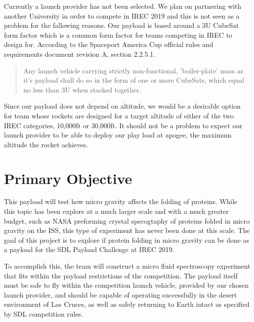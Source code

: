 \documentclass[conference]{IEEEtran} %
\begin{document}
Currently a launch provider has not been selected. We plan on partnering with another University in order to compete in IREC 2019 and this is not seen as a problem for the fallowing reasons. Our payload is based around a 3U CubeSat form factor which is a common form factor for teams competing in IREC to design for. According to the Spaceport America Cup official rules and requirements document revision A, section 2.2.5.1.\begin{quote} Any launch vehicle carrying strictly non-functional, 'boiler-plate' mass as it's payload shall do so in the form of one or more CubeSats, which equal no less than 3U when stacked together.\cite{sdl}\end{quote} Since our payload does not depend on altitude, we would be a desirable option for team whose rockets are designed for a target altitude of either of the two IREC categories, 10,000ft or 30,000ft.\cite{sdl} It should not be a problem to expect our launch provider to be able to deploy our play load at apogee, the maximum altitude the rocket achieves.

%

\section{Primary Objective}
\label{sec:primary-obj}

This payload will test how micro gravity affects the folding of proteins. While this topic has been explore at a much larger scale and with a much greater budget, such as NASA preforming crystal specogtaphy of proteins folded in micro gravity on the ISS, this type of experiment has never been done at this scale. The goal of this project is to explore if protein folding in micro gravity can be done as a payload for the SDL Payload Challenge at IREC 2019. 

To accomplish this, the team will construct a micro fluid spectroscopy experiment that fits within the payload restrictions of the competition. The payload itself must be safe to fly within the competition launch vehicle, provided by our chosen launch provider, and should be capable of operating successfully in the desert environment of Las Cruces, as well as safely returning to Earth intact as specified by SDL competition rules. 
\end{document}
